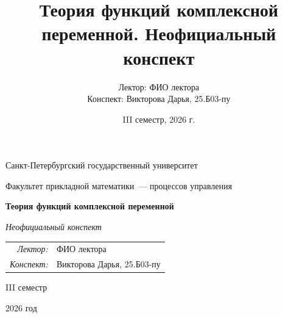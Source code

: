 \documentclass[12pt,a4paper]{report}
\title{Теория функций комплексной переменной. Неофициальный конспект}
\author{Лектор: ФИО лектора\\
Конспект: Викторова Дарья, 25.Б03-пу}
\date{III семестр, 2026 г.}
\begin{document}
\begin{titlepage}
    \thispagestyle{empty}
    \begin{center}
        \vspace*{0.6cm}

        {\large Санкт-Петербургский государственный университет\par}
        \vspace{0.35em}
        {\normalsize Факультет прикладной математики~--- процессов управления\par}

        \vspace*{5.1cm}

        {\fontsize{30}{35}\selectfont\bfseries Теория функций комплексной переменной\par}
        \vspace{0.65em}
        {\fontsize{17}{21}\selectfont\itshape Неофициальный конспект\par}

        \vspace{2.7cm}

        {\normalsize
        \begin{tabular}{@{}rl@{}}
            \textit{Лектор:} & ФИО лектора \\
            \textit{Конспект:} & Викторова Дарья, 25.Б03-пу
        \end{tabular}\par}

        \vfill

        {\large III семестр\par}
        \vspace{0.22em}
        {\large 2026 год\par}
        \vspace*{0.55cm}
    \end{center}
\end{titlepage}

\tableofcontents
\newpage

\setcounter{lection}{0}

\end{document}
